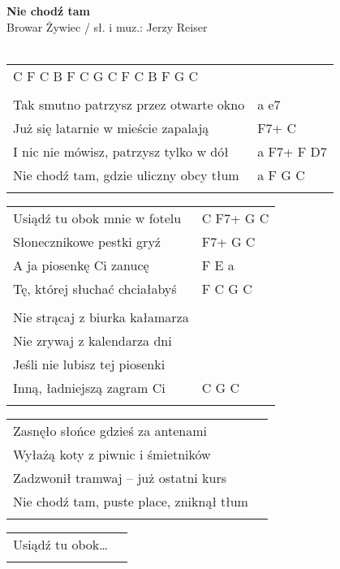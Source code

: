 \documentclass[a5paper]{article}
\begin{document}


\noindent
\fontsize{12pt}{15pt}\selectfont
\textbf{Nie chodź tam} \\
\fontsize{8pt}{10pt}\selectfont
Browar Żywiec / sł. i muz.: Jerzy Reiser \\ \\
\fontsize{10pt}{12pt}\selectfont
{}
\begin{tabular}{@{}p{8.50cm}p{3cm}@{}}
\noindent
C F C B  F C G  C F C B  F G C \\ \\
Tak smutno patrzysz przez otwarte okno & a e7 \\
Już się latarnie w mieście zapalają	& F7+ C \\
I nic nie mówisz, patrzysz tylko w dół & a F7+ F D7 \\
Nie chodź tam, gdzie uliczny obcy tłum & a F G C \\ \\
\end{tabular}

\noindent
\begin{tabular}{@{}p{7.50cm}p{3cm}@{}}
Usiądź tu obok mnie w fotelu & C F7+ G C \\
Słonecznikowe pestki gryź & F7+ G C \\
A ja piosenkę Ci zanucę & F E a \\
Tę, której słuchać chciałabyś & F C G C \\ \\
 
Nie strącaj z biurka kałamarza \\
Nie zrywaj z kalendarza dni \\
Jeśli nie lubisz tej piosenki \\
Inną, ładniejszą zagram Ci & C G C \\ \\
\end{tabular}

\noindent
\begin{tabular}{@{}p{8.50cm}p{3cm}@{}} 
Zasnęło słońce gdzieś za antenami \\
Wyłażą koty z piwnic i śmietników \\
Zadzwonił tramwaj – już ostatni kurs \\
Nie chodź tam, puste place, zniknął tłum \\ \\
\end{tabular}

\noindent
\begin{tabular}{@{}p{7.50cm}p{3cm}@{}}
Usiądź tu obok… \\ \\
\end{tabular}
\end{document}
